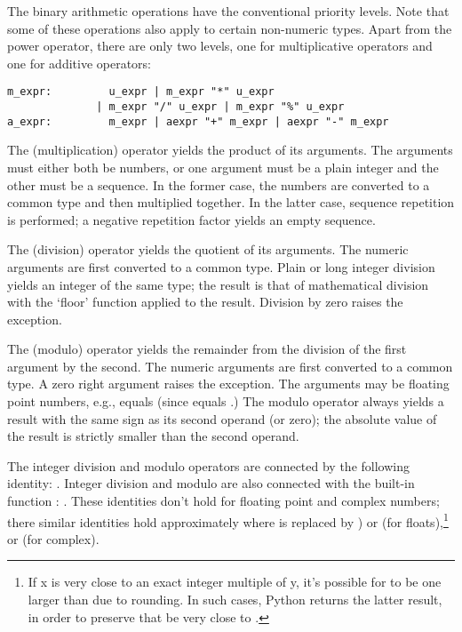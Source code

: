 The binary arithmetic operations have the conventional priority
levels.  Note that some of these operations also apply to certain
non-numeric types.  Apart from the power operator, there are only two
levels, one for multiplicative operators and one for additive
operators:

\begin{verbatim}
m_expr:         u_expr | m_expr "*" u_expr
              | m_expr "/" u_expr | m_expr "%" u_expr
a_expr:         m_expr | aexpr "+" m_expr | aexpr "-" m_expr
\end{verbatim}

The \code{*} (multiplication) operator yields the product of its
arguments.  The arguments must either both be numbers, or one argument
must be a plain integer and the other must be a sequence.  In the
former case, the numbers are converted to a common type and then
multiplied together.  In the latter case, sequence repetition is
performed; a negative repetition factor yields an empty sequence.

The \code{/} (division) operator yields the quotient of its
arguments.  The numeric arguments are first converted to a common
type.  Plain or long integer division yields an integer of the same
type; the result is that of mathematical division with the `floor'
function applied to the result.  Division by zero raises the
 exception.

The \code{\%} (modulo) operator yields the remainder from the
division of the first argument by the second.  The numeric arguments
are first converted to a common type.  A zero right argument raises
the  exception.  The arguments may be floating
point numbers, e.g.,  equals  (since
 equals .)  The modulo operator always
yields a result with the same sign as its second operand (or zero);
the absolute value of the result is strictly smaller than the second
operand.

The integer division and modulo operators are connected by the
following identity: .  Integer division and
modulo are also connected with the built-in function :
.  These identities don't hold for
floating point and complex numbers; there similar identities hold
approximately where  is replaced by ) or
 (for floats),\footnote{
    If x is very close to an exact integer multiple of y, it's
    possible for  to be one larger than
     due to rounding.  In such cases, Python returns
    the latter result, in order to preserve that  be very close to .
} or  (for
complex).

